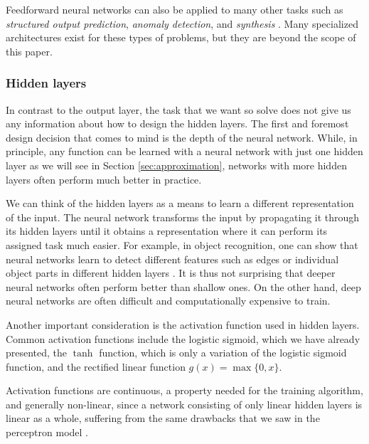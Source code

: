 Feedforward neural networks can also be applied to many other tasks such as \emph{structured output prediction}, \emph{anomaly detection}, and \emph{synthesis} \cite[Ch.\,5,\,pp.\,96-100]{DBLP:books/daglib/0040158}. Many specialized architectures exist for these types of problems, but they are beyond the scope of this paper.
\subsubsection{Hidden layers}
In contrast to the output layer, the task that we want so solve does not give us any information about how to design the hidden layers. The first and foremost design decision that comes to mind is the depth of the neural network. While, in principle, any function can be learned with a neural network with just one hidden layer as we will see in Section \ref{sec:approximation}, networks with more hidden layers often perform much better in practice.

We can think of the hidden layers as a means to learn a different representation of the input. The neural network transforms the input by propagating it through its hidden layers until it obtains a representation where it can perform its assigned task much easier. For example, in object recognition, one can show that neural networks learn to detect different features such as edges or individual object parts in different hidden layers \cite{DBLP:conf/eccv/ZeilerF14}. It is thus not surprising that deeper neural networks often perform better than shallow ones. On the other hand, deep neural networks are often difficult and computationally expensive to train.

Another important consideration is the activation function used in hidden layers. Common activation functions include the logistic sigmoid, which we have already presented, the $\tanh$ function, which is only a variation of the logistic sigmoid function, and the rectified linear function $g(x) = \max\{0,x\}$.

\begin{comment}
\begin{figure}
	\begin{center}
		
	\end{center}
	\caption{The rectified linear function.}
	\label{fig:relu}
\end{figure}
\end{comment}

Activation functions are continuous, a property needed for the training algorithm, and generally non-linear, since a network consisting of only linear hidden layers is linear as a whole, suffering from the same drawbacks that we saw in the perceptron model \cite[Ch.\,6,\,p.\,190]{DBLP:books/daglib/0040158}.

